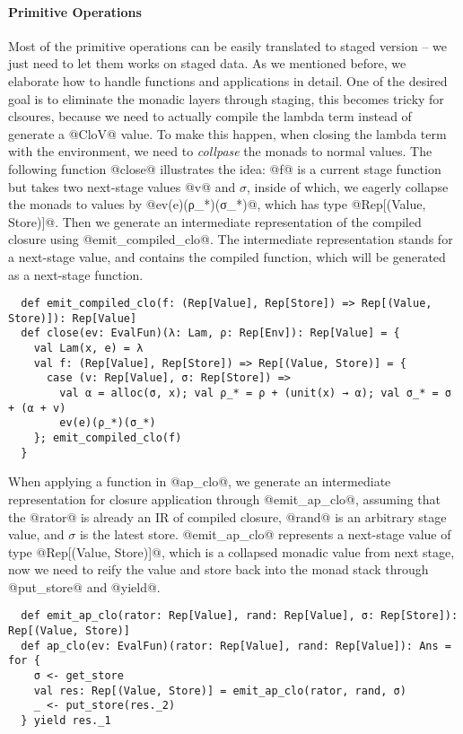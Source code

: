 \paragraph{Primitive Operations} Most of the primitive operations can be easily
translated to staged version -- we just need to let them works on staged data.
As we mentioned before, we elaborate how to handle functions and applications in
detail. One of the desired goal is to eliminate the monadic layers through
staging, this becomes tricky for clsoures, because we need to actually compile
the lambda term instead of generate a @CloV@ value. To make this happen, when
closing the lambda term with the environment, we need to \textit{collpase} the
monads to normal values. The following function @close@ illustrates the idea:
@f@ is a current stage function but takes two next-stage values @v@ and
$\sigma$, inside of which, we eagerly collapse the monads to values by
@ev(e)(ρ_*)(σ_*)@, which has type @Rep[(Value, Store)]@.
Then we generate an intermediate representation of the compiled closure using
@emit_compiled_clo@. The intermediate representation stands for a next-stage
value, and contains the compiled function, which will be generated as a
next-stage function.

\begin{lstlisting}
  def emit_compiled_clo(f: (Rep[Value], Rep[Store]) => Rep[(Value, Store)]): Rep[Value]
  def close(ev: EvalFun)(λ: Lam, ρ: Rep[Env]): Rep[Value] = {
    val Lam(x, e) = λ
    val f: (Rep[Value], Rep[Store]) => Rep[(Value, Store)] = {
      case (v: Rep[Value], σ: Rep[Store]) =>
        val α = alloc(σ, x); val ρ_* = ρ + (unit(x) → α); val σ_* = σ + (α + v)
        ev(e)(ρ_*)(σ_*)
    }; emit_compiled_clo(f)
  }
\end{lstlisting}

When applying a function in @ap_clo@, we generate an intermediate representation
for closure application through @emit_ap_clo@, assuming that the @rator@ is already an
IR of compiled closure, @rand@ is an arbitrary stage value, and $\sigma$ is the
latest store. @emit_ap_clo@ represents a next-stage value of type
@Rep[(Value, Store)]@, which is a collapsed monadic value from next stage, now
we need to reify the value and store back into the monad stack through
@put_store@ and @yield@.

\begin{lstlisting}
  def emit_ap_clo(rator: Rep[Value], rand: Rep[Value], σ: Rep[Store]): Rep[(Value, Store)]
  def ap_clo(ev: EvalFun)(rator: Rep[Value], rand: Rep[Value]): Ans = for {
    σ <- get_store
    val res: Rep[(Value, Store)] = emit_ap_clo(rator, rand, σ)
    _ <- put_store(res._2)
  } yield res._1
\end{lstlisting}

